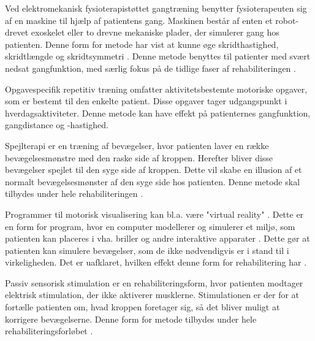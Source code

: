 Ved elektromekanisk fysioterapistøttet gangtræning benytter fysioterapeuten sig af en maskine til hjælp af patientens gang. Maskinen består af enten et robot-drevet exoskelet eller to drevne mekaniske plader, der simulerer gang hos patienten. \cite{Mehrholz2013} Denne form for metode har vist at kunne øge skridthastighed, skridtlængde og skridtsymmetri \cite{Sundhedsstyrelsen2010}. Denne metode benyttes til patienter med svært nedsat gangfunktion, med særlig fokus på de tidlige faser af rehabiliteringen \cite{Sundhedsstyrelsen2011a}.

Opgavespecifik repetitiv træning omfatter aktivitetsbestemte motoriske opgaver, som er bestemt til den enkelte patient. Disse opgaver tager udgangspunkt i hverdagsaktiviteter. Denne metode kan have effekt på patienternes gangfunktion, gangdistance og -hastighed. \cite{Sundhedsstyrelsen2010}

Spejlterapi er en træning af bevægelser, hvor patienten laver en række bevægelsesmønstre med den raske side af kroppen. Herefter bliver disse bevægelser spejlet til den syge side af kroppen. Dette vil skabe en illusion af et normalt bevægelsesmønster af den syge side hos patienten. \cite{Sundhedsstyrelsen2010} Denne metode skal tilbydes under hele rehabiliteringen \cite{Sundhedsstyrelsen2011a}.

Programmer til motorisk visualisering kan bl.a. være "virtual reality" \cite{Sundhedsstyrelsen2010}. Dette er en form for program, hvor en computer modellerer og simulerer et miljø, som patienten kan placeres i vha. briller og andre interaktive apparater \cite{Lowood2015}. Dette gør at patienten kan simulere bevægelser, som de ikke nødvendigvis er i stand til i virkeligheden. Det er uafklaret, hvilken effekt denne form for rehabilitering har \cite{Sundhedsstyrelsen2010}.

Passiv sensorisk stimulation er en rehabiliteringsform, hvor patienten modtager elektrisk stimulation, der ikke aktiverer musklerne. Stimulationen er der for at fortælle patienten om, hvad kroppen foretager sig, så det bliver muligt at korrigere bevægelserne. \cite{Sundhedsstyrelsen2010} Denne form for metode tilbydes under hele rehabiliteringsforløbet \cite{Sundhedsstyrelsen2011a}.
%
%
